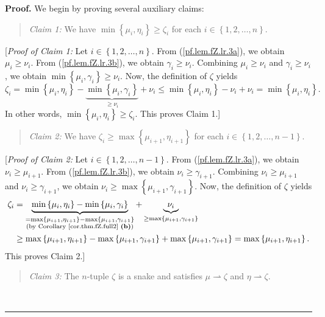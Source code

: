 \documentclass[numbers=enddot,12pt,final,onecolumn,notitlepage]{scrartcl}%
\theoremstyle{definition}
\newenvironment{statement}{\begin{quote}}{\end{quote}}
\newenvironment{proof}[1][Proof]{\noindent\textbf{#1.} }{\ \rule{0.5em}{0.5em}}
\begin{document}
\begin{proof}
We begin by proving several auxiliary claims:

\begin{statement}
\textit{Claim 1:} We have $\min\left\{  \mu_{i},\eta_{i}\right\}  \geq
\zeta_{i}$ for each $i\in\left\{  1,2,\ldots,n\right\}  $.
\end{statement}

[\textit{Proof of Claim 1:} Let $i\in\left\{  1,2,\ldots,n\right\}  $. From
(\ref{pf.lem.fZ.lr.3a}), we obtain $\mu_{i}\geq\nu_{i}$. From
(\ref{pf.lem.fZ.lr.3b}), we obtain $\gamma_{i}\geq\nu_{i}$. Combining $\mu
_{i}\geq\nu_{i}$ and $\gamma_{i}\geq\nu_{i}$, we obtain $\min\left\{  \mu
_{i},\gamma_{i}\right\}  \geq\nu_{i}$. Now, the definition of $\zeta$ yields%
\[
\zeta_{i}=\min\left\{  \mu_{i},\eta_{i}\right\}  -\underbrace{\min\left\{
\mu_{i},\gamma_{i}\right\}  }_{\geq\nu_{i}}+\nu_{i}\leq\min\left\{  \mu
_{i},\eta_{i}\right\}  -\nu_{i}+\nu_{i}=\min\left\{  \mu_{i},\eta_{i}\right\}
.
\]
In other words, $\min\left\{  \mu_{i},\eta_{i}\right\}  \geq\zeta_{i}$. This
proves Claim 1.]

\begin{statement}
\textit{Claim 2:} We have $\zeta_{i}\geq\max\left\{  \mu_{i+1},\eta
_{i+1}\right\}  $ for each $i\in\left\{  1,2,\ldots,n-1\right\}  $.
\end{statement}

[\textit{Proof of Claim 2:} Let $i\in\left\{  1,2,\ldots,n-1\right\}  $. From
(\ref{pf.lem.fZ.lr.3a}), we obtain $\nu_{i}\geq\mu_{i+1}$. From
(\ref{pf.lem.fZ.lr.3b}), we obtain $\nu_{i}\geq\gamma_{i+1}$. Combining
$\nu_{i}\geq\mu_{i+1}$ and $\nu_{i}\geq\gamma_{i+1}$, we obtain $\nu_{i}%
\geq\max\left\{  \mu_{i+1},\gamma_{i+1}\right\}  $. Now, the definition of
$\zeta$ yields%
\begin{align*}
\zeta_{i}  &  =\underbrace{\min\left\{  \mu_{i},\eta_{i}\right\}
-\min\left\{  \mu_{i},\gamma_{i}\right\}  }_{\substack{=\max\left\{  \mu
_{i+1},\eta_{i+1}\right\}  -\max\left\{  \mu_{i+1},\gamma_{i+1}\right\}
\\\text{(by Corollary \ref{cor.thm.fZ.full2} \textbf{(b)})}}}+\underbrace{\nu
_{i}}_{\geq\max\left\{  \mu_{i+1},\gamma_{i+1}\right\}  }\\
&  \geq\max\left\{  \mu_{i+1},\eta_{i+1}\right\}  -\max\left\{  \mu
_{i+1},\gamma_{i+1}\right\}  +\max\left\{  \mu_{i+1},\gamma_{i+1}\right\}
=\max\left\{  \mu_{i+1},\eta_{i+1}\right\}  .
\end{align*}
This proves Claim 2.]

\begin{statement}
\textit{Claim 3:} The $n$-tuple $\zeta$ is a snake and satisfies
$\mu\rightharpoonup\zeta$ and $\eta\rightharpoonup\zeta$.
\end{statement}


\end{proof}
\end{document}
